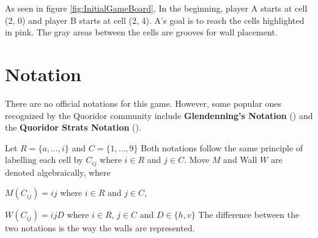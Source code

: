 As seen in figure \ref{fig:InitialGameBoard}, In the beginning, player A starts at cell (2, 0) and player B 
starts at cell (2, 4). A's goal is to reach the cells highlighted in pink. The gray areas between the cells
are grooves for wall placement.


\section{Notation}

There are no official notations for this game. However, some popular ones recognized by the Quoridor community
include \textbf{Glendenning's Notation} (\citep{Glendenning2002MasteringQ}) and the \textbf{Quoridor Strats Notation}
(\citep{website:COMMUNITY_NOTATION}). 
\par
Let $R = \{a, ..., i\}$ and $C = \{1, ..., 9\}$
\newline
Both notations follow the same principle of labelling each cell by $C_{ij}$ where $i \in R$ and $j \in C$.
\newline
Move $M$ and Wall $W$ are denoted algebraically, where
\par
$M(C_{ij}) = ij$ where $i \in R$ and $j \in C $,
\par
$W(C_{ij}) = ijD$ where $i \in R$, $j \in C$ and $D \in \{h, v\}$
\newline
\newline
The difference between the two notations is the way the walls are represented.

